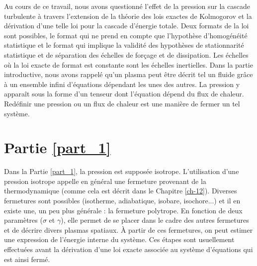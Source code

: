 Au cours de ce travail, nous avons questionné l'effet de la pression sur la cascade turbulente à travers l'extension de la théorie des lois exactes de Kolmogorov et la dérivation d'une telle loi pour la cascade d'énergie totale. Deux formats de la loi sont possibles, le format  qui ne prend en compte que l'hypothèse d'homogénéité statistique et le format  qui implique la validité des hypothèses de stationnarité statistique et de séparation des échelles de forçage et de dissipation. Les échelles où la loi exacte de format   est constante sont les échelles inertielles. Dans la partie introductive, nous avons rappelé qu'un plasma peut être décrit tel un fluide grâce à un ensemble infini d'équations dépendant les unes des autres. La pression y apparaît sous la forme d'un tenseur dont l'équation dépend du flux de chaleur. Redéfinir une pression ou un flux de chaleur est une manière de fermer un tel système. 

\section{Partie \ref{part_1}}

Dans la Partie \ref{part_1}, la pression est supposée isotrope. L'utilisation d'une pression isotrope appelle en général une fermeture provenant de la thermodynamique (comme cela est décrit dans le Chapitre \ref{ch-12}). Diverses fermetures sont possibles (isotherme, adiabatique, isobare, isochore...) et il en existe une, un peu plus générale : la fermeture polytrope. En fonction de deux paramètres ($\sigma$ et $\gamma$), elle permet de se placer dans le cadre des autres fermetures et de décrire divers plasmas spatiaux. À partir de ces fermetures, on peut estimer une expression de l'énergie interne du système. Ces étapes sont usuellement effectuées avant la dérivation d'une loi exacte associée au système d'équations qui est ainsi fermé. 

